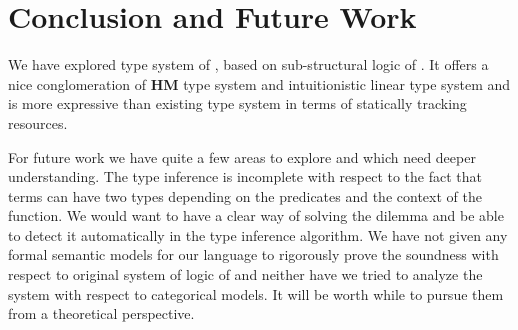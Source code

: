 \chapter{Conclusion and Future Work}\label{chp:conclusion}

We have explored type system of \qub{}, based on sub-structural logic of \BI{}.
It offers a nice conglomeration of \textbf{HM} type system and intuitionistic linear type system and is more
expressive than existing type system in terms of statically tracking resources.


For future work we have quite a few areas to explore and which need deeper understanding.
The \qub{} type inference is incomplete with respect to the fact that terms can have two types depending
on the predicates and the context of the function. We would want to have a clear way of solving
the dilemma and be able to detect it automatically in the type inference algorithm.
We have not given any formal semantic models for our language to rigorously prove the soundness with respect to original
system of logic of \BI{} and neither have we tried to analyze the system with respect to categorical models.
It will be worth while to pursue them from a theoretical perspective.